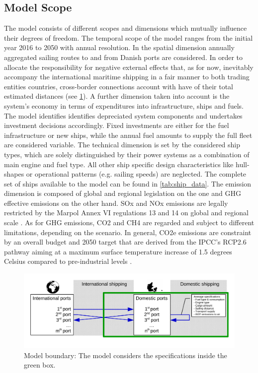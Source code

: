 \documentclass[article]{elsarticle}
\begin{document}
\subsection{Model Scope}
\label{subsec:Scope}
The model consists of different scopes and dimensions which mutually influence their degrees of freedom. The temporal scope of the model ranges from the initial year 2016 to 2050 with annual resolution. In the spatial dimension annually aggregated sailing routes to and from Danish ports are considered. In order to allocate the responsibility for negative external effects that, as for now, inevitably accompany the international maritime shipping in a fair manner to both trading entities countries, cross-border connections account with have of their total estimated distances (see \cref{fig:model_boundary}). A further dimension taken into account is the system's economy in terms of expenditures into infrastructure, ships and fuels. The model identifies identifies depreciated system components and undertakes investment decisions accordingly. Fixed investments are either for the fuel infrastructure or new ships, while the annual fuel amounts to supply the full fleet are considered variable. The technical dimension is set by the considered ship types, which are solely distinguished by their power systems as a combination of main engine and fuel type. All other ship specific design characteristics like hull-shapes or operational patterns (e.g. sailing speeds) are neglected. The complete set of ships available to the model can be found in \cref{tab:ship_data}. The emission dimension is composed of global and regional legislation on the one and GHG effective emissions on the other hand. SOx and NOx emissions are legally restricted by the Marpol Annex VI regulations 13 and 14 on global and regional scale \cite{IMO2008a,IMO2008b}. As for GHG emissions, CO2 and CH4 are regarded and subject to different limitations, depending on the scenario. In general, CO2e emissions are constraint by an overall budget and 2050 target that are derived from the IPCC's RCP2.6 pathway aiming at a maximum surface temperature increase of 1.5 degrees Celsius compared to pre-industrial levels \cite[p.~27]{IPCC2013}.

\begin{figure}[htb]
    \centering
    \includegraphics[width=\textwidth]{figures/model_boundary_paper.pdf}
    \caption{Model boundary: The model considers the specifications inside the green box.}
    \label{fig:model_boundary}
\end{figure}
\end{document}
